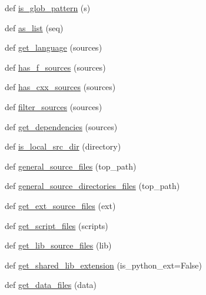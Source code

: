 \begin{DoxyCompactItemize}
\item 
def \hyperlink{namespacenumpy_1_1distutils_1_1misc__util_af71ba215fcc54224d7e7dac0914b9280}{is\+\_\+glob\+\_\+pattern} (s)
\item 
def \hyperlink{namespacenumpy_1_1distutils_1_1misc__util_afa88c0eeead019765b06a28b63f5d915}{as\+\_\+list} (seq)
\item 
def \hyperlink{namespacenumpy_1_1distutils_1_1misc__util_a29883d80dda29923faebef5e0f9910fc}{get\+\_\+language} (sources)
\item 
def \hyperlink{namespacenumpy_1_1distutils_1_1misc__util_a11db8962c223fdcd7cabb940aa283fbb}{has\+\_\+f\+\_\+sources} (sources)
\item 
def \hyperlink{namespacenumpy_1_1distutils_1_1misc__util_a3184a5a3f353783f19b823b7370be16e}{has\+\_\+cxx\+\_\+sources} (sources)
\item 
def \hyperlink{namespacenumpy_1_1distutils_1_1misc__util_a403d1a391f3b8d243e5d2106c58c1e9e}{filter\+\_\+sources} (sources)
\item 
def \hyperlink{namespacenumpy_1_1distutils_1_1misc__util_a06365fbb2422b3a3921f75d94037e549}{get\+\_\+dependencies} (sources)
\item 
def \hyperlink{namespacenumpy_1_1distutils_1_1misc__util_a99a39a1cce04b0fa5473de0490a3fb91}{is\+\_\+local\+\_\+src\+\_\+dir} (directory)
\item 
def \hyperlink{namespacenumpy_1_1distutils_1_1misc__util_a32bb9c885361138c2e924ec2c3ec2b91}{general\+\_\+source\+\_\+files} (top\+\_\+path)
\item 
def \hyperlink{namespacenumpy_1_1distutils_1_1misc__util_a5dd53a8de1d5c7765792afd9cd2fb73b}{general\+\_\+source\+\_\+directories\+\_\+files} (top\+\_\+path)
\item 
def \hyperlink{namespacenumpy_1_1distutils_1_1misc__util_a1ff7fa88a441dd6768adf562de262bbf}{get\+\_\+ext\+\_\+source\+\_\+files} (ext)
\item 
def \hyperlink{namespacenumpy_1_1distutils_1_1misc__util_a53fb9eaf37aae9882c1e7902ca5d4019}{get\+\_\+script\+\_\+files} (scripts)
\item 
def \hyperlink{namespacenumpy_1_1distutils_1_1misc__util_a3fb1af12dafec058834a43f5f5864eb1}{get\+\_\+lib\+\_\+source\+\_\+files} (lib)
\item 
def \hyperlink{namespacenumpy_1_1distutils_1_1misc__util_a77216d888bf3769ce65633d4d253a3ee}{get\+\_\+shared\+\_\+lib\+\_\+extension} (is\+\_\+python\+\_\+ext=False)
\item 
def \hyperlink{namespacenumpy_1_1distutils_1_1misc__util_a8bb2361823eabb99720c8ea723242e57}{get\+\_\+data\+\_\+files} (data)

\end{DoxyCompactItemize}
